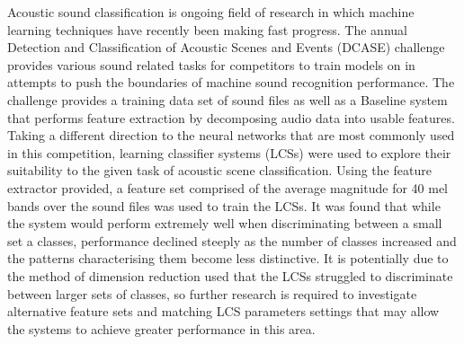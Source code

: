 \documentclass[11pt]{article}
\begin{document}
Acoustic sound classification is ongoing field of research in which machine learning techniques have recently been making fast progress. The annual Detection and Classification of Acoustic Scenes and Events (DCASE) challenge provides various sound related tasks for competitors to train models on in attempts to push the boundaries of machine sound recognition performance. The challenge provides a training data set of sound files as well as a Baseline system that performs feature extraction by decomposing audio data into usable features. Taking a different direction to the neural networks that are most commonly used in this competition, learning classifier systems (LCSs) were used to explore their suitability to the given task of acoustic scene classification. Using the feature extractor provided, a feature set comprised of the average magnitude for 40 mel bands over the sound files was used to train the LCSs. It was found that while the system would perform extremely well when discriminating between a small set a classes, performance declined steeply as the number of classes increased and the patterns characterising them become less distinctive. It is potentially due to the method of dimension reduction used that the LCSs struggled to discriminate between larger sets of classes, so further research is required to investigate alternative feature sets and matching LCS parameters settings that may allow the systems to achieve greater performance in this area.




\pagebreak



\end{document}
